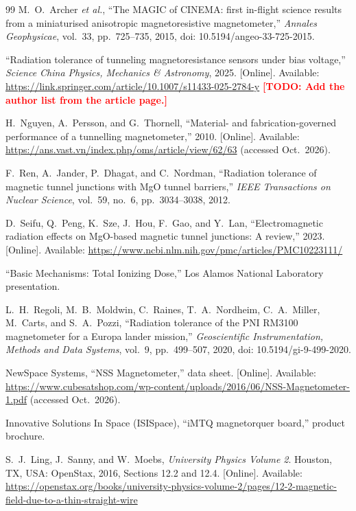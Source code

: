 \documentclass[12pt,a4paper]{article}
\newcommand{\todo}[1]{\textcolor{red}{\textbf{[TODO: #1]}}}
\begin{document}
\begin{thebibliography}{99}
M.\ O.\ Archer \emph{et al.}, ``The MAGIC of CINEMA: first in-flight science results from a miniaturised anisotropic magnetoresistive magnetometer,'' \emph{Annales Geophysicae}, vol.~33, pp.~725--735, 2015, doi: 10.5194/angeo-33-725-2015.

``Radiation tolerance of tunneling magnetoresistance sensors under bias voltage,'' \emph{Science China Physics, Mechanics \& Astronomy}, 2025. [Online]. Available: \url{https://link.springer.com/article/10.1007/s11433-025-2784-y} \todo{Add the author list from the article page.}

H.\ Nguyen, A.\ Persson, and G.\ Thornell, ``Material- and fabrication-governed performance of a tunnelling magnetometer,'' 2010. [Online]. Available: \url{https://ans.vast.vn/index.php/oms/article/view/62/63} (accessed Oct.\ 2026).

F.\ Ren, A.\ Jander, P.\ Dhagat, and C.\ Nordman, ``Radiation tolerance of magnetic tunnel junctions with MgO tunnel barriers,'' \emph{IEEE Transactions on Nuclear Science}, vol.~59, no.~6, pp.~3034--3038, 2012.

D.\ Seifu, Q.\ Peng, K.\ Sze, J.\ Hou, F.\ Gao, and Y.\ Lan, ``Electromagnetic radiation effects on MgO-based magnetic tunnel junctions: A review,'' 2023. [Online]. Available: \url{https://www.ncbi.nlm.nih.gov/pmc/articles/PMC10223111/}

``Basic Mechanisms: Total Ionizing Dose,'' Los Alamos National Laboratory presentation.

L.\ H.\ Regoli, M.\ B.\ Moldwin, C.\ Raines, T.\ A.\ Nordheim, C.\ A.\ Miller, M.\ Carts, and S.\ A.\ Pozzi, ``Radiation tolerance of the PNI RM3100 magnetometer for a Europa lander mission,'' \emph{Geoscientific Instrumentation, Methods and Data Systems}, vol.~9, pp.~499--507, 2020, doi: 10.5194/gi-9-499-2020.

NewSpace Systems, ``NSS Magnetometer,'' data sheet. [Online]. Available: \url{https://www.cubesatshop.com/wp-content/uploads/2016/06/NSS-Magnetometer-1.pdf} (accessed Oct.\ 2026).

Innovative Solutions In Space (ISISpace), ``iMTQ magnetorquer board,'' product brochure.

S.\ J.\ Ling, J.\ Sanny, and W.\ Moebs, \emph{University Physics Volume 2}. Houston, TX, USA: OpenStax, 2016, Sections 12.2 and 12.4. [Online]. Available: \url{https://openstax.org/books/university-physics-volume-2/pages/12-2-magnetic-field-due-to-a-thin-straight-wire}


\end{thebibliography}
\end{document}
